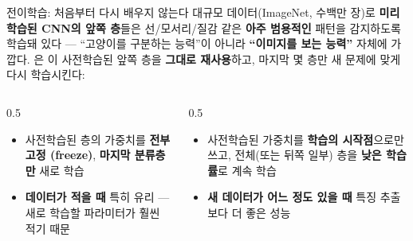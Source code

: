 \begin{frame}{전이학습: 처음부터 다시 배우지 않는다}
  대규모 데이터(ImageNet, 수백만 장)로 \textbf{미리 학습된
  CNN의 앞쪽 층}들은 선/모서리/질감 같은 \textbf{아주 범용적인}
  패턴을 감지하도록 학습돼 있다 --- ``고양이를 구분하는
  능력''이 아니라 \textbf{``이미지를 보는 능력''} 자체에 가깝다.
  은 이 사전학습된 앞쪽
  층을 \textbf{그대로 재사용}하고, 마지막 몇 층만 새 문제에 맞게
  다시 학습시킨다:
  \begin{columns}[T]
    \begin{column}{0.5\textwidth}
      \begin{itemize}
        \item 사전학습된 층의 가중치를 \textbf{전부 고정
          (freeze)}, \textbf{마지막 분류층만} 새로 학습
        \item \textbf{데이터가 적을 때} 특히 유리 ---
          새로 학습할 파라미터가 훨씬 적기 때문
      \end{itemize}
    \end{column}
    \begin{column}{0.5\textwidth}
      \begin{itemize}
        \item 사전학습된 가중치를 \textbf{학습의 시작점}으로만
          쓰고, 전체(또는 뒤쪽 일부) 층을 \textbf{낮은 학습률}로
          계속 학습
        \item \textbf{새 데이터가 어느 정도 있을 때} 특징 추출보다
          더 좋은 성능
      \end{itemize}
    \end{column}
  \end{columns}
\end{frame}
